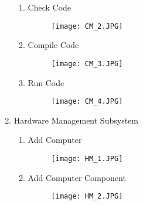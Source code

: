 \documentclass{article}
\begin{document}
\begin{enumerate}
\begin{enumerate}
                    \item{Check Code}
                    \begin{figure}[H]
                    	\centering
                        \texttt{[image: CM\_2.JPG]}
                        \newline
                        \newline
                    \end{figure}
                    
                    
                    \item{Compile Code}
                    \begin{figure}[H]
                    	\centering
                        \texttt{[image: CM\_3.JPG]}
                        \newline
                        \newline
                    \end{figure}
                    
                    \item{Run Code}
                    \begin{figure}[H]
                    	\centering
                        \texttt{[image: CM\_4.JPG]}
                        \newline
                        \newline
                    \end{figure}
            	\end{enumerate}
                
            \item{Hardware Management Subsystem}
        		\begin{enumerate}
                    \item{Add Computer}
                    \begin{figure}[H]
                    	\centering
                        \texttt{[image: HM\_1.JPG]}	
                        \newline
                        \newline
                    \end{figure}
                    
                    \item{Add Computer Component}
                    \begin{figure}[H]
                    	\centering
                        \texttt{[image: HM\_2.JPG]}
                        \newline
                        \newline
                    \end{figure}
                    

\end{enumerate}
\end{enumerate}
\end{document}
